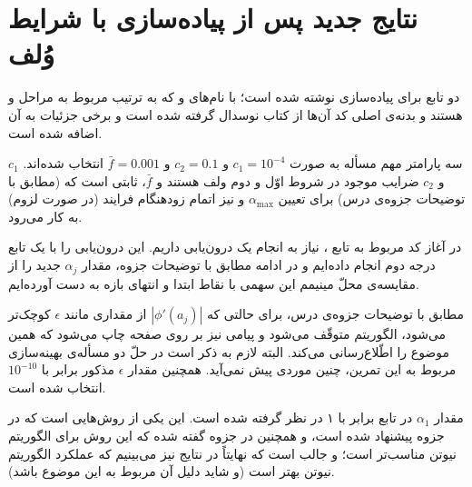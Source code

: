 \documentclass[a4paper]{article}
\theoremstyle{plain}
\theoremstyle{definition}
\theoremstyle{remark}
\begin{document}
\clearpage
\section{نتایج جدید پس از پیاده‌سازی  با شرایط وُلف}
\propositionn
دو تابع برای پیاده‌سازی  نوشته شده است؛ با نام‌های  و  که به ترتیب مربوط به مراحل  و  هستند و بدنه‌ی اصلی کد آن‌ها از کتاب نوسدال گرفته شده است و برخی جزئیات به آن اضافه شده است.

\propositionn
سه پارامتر مهم مسأله به صورت 
$ c_1 = 10^{-4} $
 و 
 $ c_2 = 0.1 $
  و 
  $ \bar{f} = 0.001 $
   انتخاب شده‌اند. $ c_1 $ و $ c_2 $ ضرایب موجود در شروط اوّل و دوم ولف هستند و $ \bar{f} $، ثابتی است که (مطابق با توضیحات جزوه‌ی درس) برای تعیین $ \alpha_{\mathrm{max}} $ و نیز اتمام زودهنگام فرایند 
    (در صورت لزوم) به کار می‌رود.

\propositionn
در آغاز کد مربوط به تابع ، نیاز به انجام یک درون‌یابی داریم. این درون‌یابی را با یک تابع درجه دوم انجام داده‌ایم و در ادامه مطابق با توضیحات جزوه، مقدار $ \alpha_j $ جدید را از مقایسه‌ی محلّ مینیمم این سهمی با نقاط ابتدا و انتهای بازه به دست آورده‌ایم.

\propositionn
مطابق با توضیحات جزوه‌ی درس، برای حالتی که $ |\phi'(a_j)| $ از مقداری مانند $ \epsilon $ کوچک‌تر می‌شود، الگوریتم  متوقّف می‌شود و پیامی نیز بر روی صفحه چاپ می‌شود که همین موضوع را اطّلاع‌رسانی می‌کند. البته لازم به ذکر است در حلّ دو مسأله‌ی بهینه‌سازی مربوط به این تمرین، چنین موردی پیش نمی‌آید. همچنین مقدار $ \epsilon $ مذکور برابر با $ 10^{-10} $ انتخاب شده است.

\propositionn
مقدار $ \alpha_1 $ در تابع  برابر با ۱ در نظر گرفته شده است. این یکی از روش‌هایی است که در جزوه پیشنهاد شده است، و همچنین در جزوه گفته شده که این روش برای الگوریتم نیوتن مناسب‌تر است؛ و جالب است که نهایتاً در نتایج نیز می‌بینیم که عملکرد الگوریتم نیوتن بهتر است (و شاید دلیل آن مربوط به این موضوع باشد).\\
\end{document}
